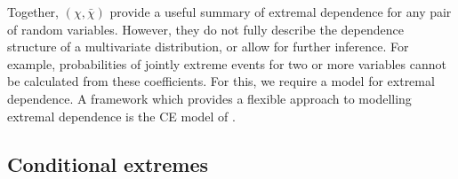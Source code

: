 \documentclass{article}
\numberwithin{equation}{section}
\begin{document}
Together, $(\chi, \bar{\chi})$ provide a useful summary of extremal dependence for any pair of random variables.
However, they do not fully describe the dependence structure of a multivariate distribution, or allow for further inference.
For example, probabilities of jointly extreme events for two or more variables cannot be calculated from these coefficients.
For this, we require a model for extremal dependence.
A framework which provides a flexible approach to modelling extremal dependence is the CE model of \citet{Heffernan2004}. 

\subsection{Conditional extremes}


\end{document}
